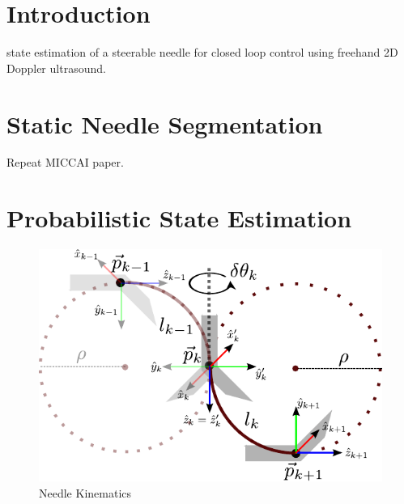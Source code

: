 \documentclass[journal,transmag]{IEEEtran}
\begin{document}
\IEEEdisplaynontitleabstractindextext




%
\IEEEpeerreviewmaketitle



\section{Introduction}
 state estimation of a steerable needle for closed loop control using freehand 2D Doppler ultrasound.

\section{Static Needle Segmentation}
Repeat MICCAI paper.

\section{Probabilistic State Estimation}
\begin{figure}[!t]
\centering
\includegraphics[scale=0.9]{Figures/NeedleKinematics.pdf}
\caption{Needle Kinematics}
\label{fig_nk}
\end{figure}
\end{document}

